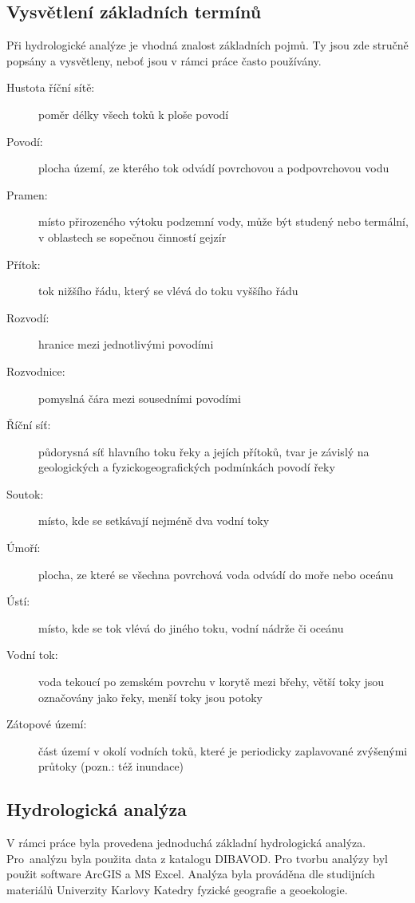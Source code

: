 \documentclass[thesis=M,czech]{FITthesis}[2012/06/26]
\begin{document}
\subsection{Vysvětlení základních termínů}
Při hydrologické analýze je vhodná znalost základních pojmů. Ty jsou zde stručně popsány a vysvětleny, neboť jsou v rámci práce často používány. \cite{terminy}


\begin{description}
\item[Hustota říční sítě:] poměr délky všech toků k ploše povodí
\item[Povodí:] plocha území, ze kterého tok odvádí povrchovou a podpovrchovou vodu
\item[Pramen:] místo přirozeného výtoku podzemní vody, může být studený nebo termální, v oblastech se sopečnou činností gejzír
\item[Přítok:] tok nižšího řádu, který se vlévá do toku vyššího řádu
\item[Rozvodí:] hranice mezi jednotlivými povodími
\item[Rozvodnice:] pomyslná čára mezi sousedními povodími
\item[Říční síť:] půdorysná síť hlavního toku řeky a jejích přítoků, tvar je závislý na geologických a fyzickogeografických podmínkách povodí řeky
\item[Soutok:] místo, kde se setkávají nejméně dva vodní toky
\item[Úmoří:] plocha, ze které se všechna povrchová voda odvádí do moře nebo oceánu
\item[Ústí:] místo, kde se tok vlévá do jiného toku, vodní nádrže či oceánu
\item[Vodní tok:] voda tekoucí po zemském povrchu v korytě mezi břehy, větší toky jsou označovány jako řeky, menší toky jsou potoky
\item[Zátopové území:] část území v okolí vodních toků, které je periodicky zaplavované zvýšenými průtoky (pozn.: též inundace)
\end{description}



\subsection{Hydrologická analýza}
V rámci práce byla provedena jednoduchá základní hydrologická analýza. Pro~analýzu byla použita data z katalogu DIBAVOD. Pro tvorbu analýzy byl použit software ArcGIS a MS Excel. Analýza byla prováděna dle studijních materiálů Univerzity Karlovy Katedry fyzické geografie a geoekologie. \cite{UK}
\end{document}
